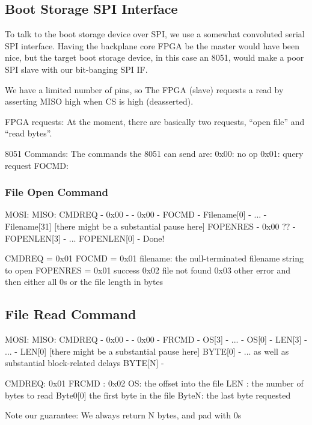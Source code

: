 \subsection{Boot Storage SPI Interface}

To talk to the boot storage device over SPI, we use a somewhat
convoluted serial SPI interface. Having the backplane core FPGA be the
master would have been nice, but the target boot storage device, in this
case an 8051, would make a poor SPI slave with our bit-banging SPI IF. 

We have a limited number of pins, so The FPGA (slave) requests a read
by asserting MISO high when CS is high (deasserted). 

FPGA requests: At the moment, there are basically two requests, ``open
file'' and ``read bytes''.

8051 Commands: The commands the 8051 can send are: 
0x00: no op
0x01: query request
FOCMD: 
\subsubsection{File Open Command}
MOSI:          MISO:
CMDREQ          - 
 0x00           -
  -            0x00 
  -            FOCMD
  -            Filename[0]
  -             ...
  -            Filename[31]
     [there might be a substantial pause here]
FOPENRES         -
0x00 ??            -
FOPENLEN[3]      -
...
FOPENLEN[0]      - 
Done!


CMDREQ = 0x01
FOCMD  = 0x01
filename: the null-terminated filename string to open
FOPENRES = 0x01 success
           0x02 file not found
           0x03 other error
and then either all 0s or the file length in bytes


\subsection{File Read Command}
MOSI:           MISO:
CMDREQ            -
0x00              - 
  -             0x00
  -             FRCMD
  -              OS[3]
  -              ...
  -              OS[0]
  -             LEN[3]
  -             ... 
  -             LEN[0]
   [there might be a substantial pause here]
BYTE[0]           -
 ...              as well as substantial block-related delays
BYTE[N]           - 
  
CMDREQ: 0x01
FRCMD : 0x02
OS: the offset into the file
LEN : the number of bytes to read
Byte0[0] the first byte in the file
ByteN: the last byte requested

Note our guarantee: We always return N bytes, and pad with 0s


